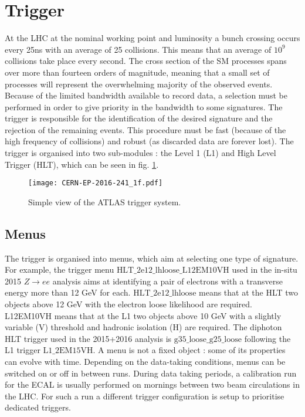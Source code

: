 \section{Trigger}
\label{sec:org90db134}
\label{sec:Detector_Trigger}

At the LHC at the nominal working point and luminosity a bunch crossing occurs every 25ns with an average of 25 collisions.
This means that an average of $10^9$ collisions take place every second.
The cross section of the SM processes spans over more than fourteen orders of magnitude, meaning that a small set of processes will represent the overwhelming majority of the observed events.
Because of the limited bandwidth available to record data, a selection must be performed in order to give priority in the bandwidth to some signatures.
The trigger \cite{CERN-EP-2016-241,CERN-PH-EP-2011-078} is responsible for the identification of the desired signature and the rejection of the remaining events.
This procedure must be fast (because of the high frequency of collisions) and robust (as discarded data are forever lost).
The trigger is organised into two sub-modules : the Level 1 (L1) and High Level Trigger (HLT), which can be seen in fig. \ref{fig:org4a2d846}.

\begin{figure}[htbp]
\centering
\texttt{[image: CERN-EP-2016-241\_1f.pdf]}
\caption{\label{fig:org4a2d846}
Simple view of the ATLAS trigger system.\cite{CERN-EP-2016-241}}
\end{figure}


\subsection{Menus}
\label{sec:org5d5bf3d}

The trigger is organised into menus, which aim at selecting one type of signature.
For example, the trigger menu \(\text{HLT\_2e12\_lhloose\_L12EM10VH}\) used in the in-situ 2015 $Z\rightarrow ee$ analysis aims at identifying a pair of electrons with a transverse energy more than 12 GeV for each.
\(\text{HLT\_2e12\_lhloose}\) means that at the HLT two objects above 12 GeV with the electron loose likelihood are required.
L12EM10VH means that at the L1 two objects above 10 GeV with a slightly variable (V) threshold and hadronic isolation (H) are required.
The diphoton HLT trigger used in the 2015+2016 analysis is \(\text{g35\_loose\_g25\_loose}\) following the L1 trigger \(\text{L1\_2EM15VH}\).
A menu is not a fixed object : some of its properties can evolve with time.
Depending on the data-taking conditions, menus can be switched on or off in between runs.
During data taking periods, a calibration run for the ECAL is usually performed on mornings between two beam circulations in the LHC.
For such a run a different trigger configuration is setup to prioritise dedicated triggers.

